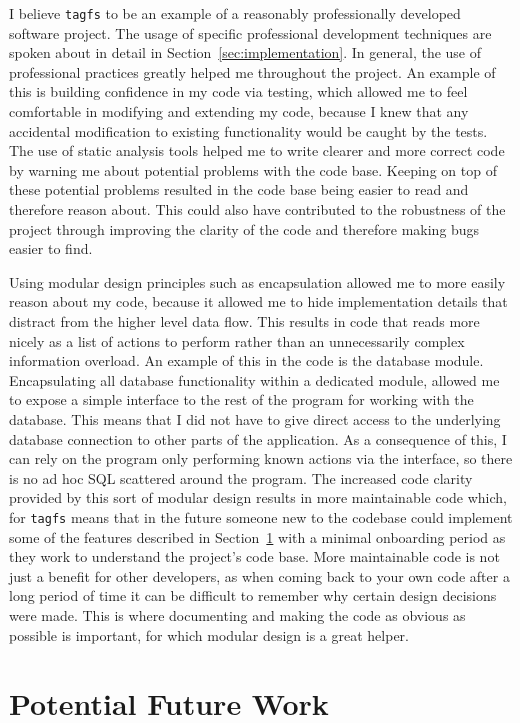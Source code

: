 I believe \texttt{tagfs} to be an example of a reasonably professionally
developed software project. The usage of specific professional development
techniques are spoken about in detail in Section~\ref{sec:implementation}. In
general, the use of professional practices greatly helped me throughout the
project. An example of this is building confidence in my code via testing,
which allowed me to feel comfortable in modifying and extending my code,
because I knew that any accidental modification to existing functionality would
be caught by the tests. The use of static analysis tools helped me to write
clearer and more correct code by warning me about potential problems with the
code base. Keeping on top of these potential problems resulted in the code base
being easier to read and therefore reason about. This could also have
contributed to the robustness of the project through improving the clarity of
the code and therefore making bugs easier to find.

Using modular design principles such as encapsulation allowed me to more easily
reason about my code, because it allowed me to hide implementation details that
distract from the higher level data flow. This results in code that reads more
nicely as a list of actions to perform rather than an unnecessarily complex
information overload. An example of this in the code is the database module.
Encapsulating all database functionality within a dedicated module, allowed me
to expose a simple interface to the rest of the program for working with the
database. This means that I did not have to give direct access to the
underlying database connection to other parts of the application. As a
consequence of this, I can rely on the program only performing known actions
via the interface, so there is no ad hoc SQL scattered around the program. The
increased code clarity provided by this sort of modular design results in more
maintainable code which, for \texttt{tagfs} means that in the future someone
new to the codebase could implement some of the features described in
Section~\ref{sec:potential-features} with a minimal onboarding period as they
work to understand the project's code base. More maintainable code is not just
a benefit for other developers, as when coming back to your own code after a
long period of time it can be difficult to remember why certain design
decisions were made. This is where documenting and making the code as obvious
as possible is important, for which modular design is a great helper.

\section{Potential Future Work}
\label{sec:potential-features}

